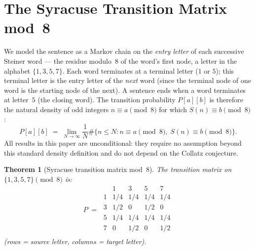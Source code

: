 \documentclass[12pt]{article}
\newtheorem{theorem}{Theorem}[section]
\theoremstyle{definition}
\theoremstyle{remark}
\newcommand{\Sm}{S}
\begin{document}
\section{The Syracuse Transition Matrix mod~8}
\label{sec:matrix}

We model the sentence as a Markov chain on the \emph{entry letter} of each
successive Steiner word — the residue modulo~8 of the word's first node,
a letter in the alphabet $\{1,3,5,7\}$.
Each word terminates at a terminal letter ($1$ or $5$); this terminal letter is
the entry letter of the \emph{next} word (since the terminal node of one word
is the starting node of the next).
A sentence ends when a word terminates at letter~$5$ (the closing word).
The transition probability $P[a][b]$ is therefore the natural density of
odd integers $n \equiv a \pmod{8}$ for which $\Sm(n) \equiv b \pmod{8}$:
\[
  P[a][b] \;=\; \lim_{N\to\infty} \frac{1}{N}\#\{n \leq N : n \equiv a \pmod 8,\; \Sm(n) \equiv b \pmod 8\}.
\]
All results in this paper are unconditional: they require no assumption beyond this
standard density definition and do not depend on the Collatz conjecture.

\begin{theorem}[Syracuse transition matrix mod~8]
\label{thm:matrix}
The transition matrix on $\{1, 3, 5, 7\} \pmod{8}$ is:
\[
P \;=\;
\begin{array}{c|cccc}
   & 1   & 3   & 5   & 7   \\
\hline
1  & 1/4 & 1/4 & 1/4 & 1/4 \\
3  & 1/2 & 0   & 1/2 & 0   \\
5  & 1/4 & 1/4 & 1/4 & 1/4 \\
7  & 0   & 1/2 & 0   & 1/2 \\
\end{array}
\]
(rows = source letter, columns = target letter).
\end{theorem}
\end{document}
